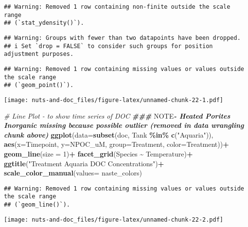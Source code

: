 \documentclass[
]{article}
\newenvironment{Shaded}{\begin{snugshade}}{\end{snugshade}}
\newcommand{\AlertTok}[1]{\textcolor[rgb]{0.94,0.16,0.16}{#1}}
\newcommand{\AttributeTok}[1]{\textcolor[rgb]{0.13,0.29,0.53}{#1}}
\newcommand{\CommentTok}[1]{\textcolor[rgb]{0.56,0.35,0.01}{\textit{#1}}}
\newcommand{\DecValTok}[1]{\textcolor[rgb]{0.00,0.00,0.81}{#1}}
\newcommand{\DocumentationTok}[1]{\textcolor[rgb]{0.56,0.35,0.01}{\textbf{\textit{#1}}}}
\newcommand{\FunctionTok}[1]{\textcolor[rgb]{0.13,0.29,0.53}{\textbf{#1}}}
\newcommand{\NormalTok}[1]{#1}
\newcommand{\SpecialCharTok}[1]{\textcolor[rgb]{0.81,0.36,0.00}{\textbf{#1}}}
\newcommand{\StringTok}[1]{\textcolor[rgb]{0.31,0.60,0.02}{#1}}
\begin{document}
\begin{verbatim}
## Warning: Removed 1 row containing non-finite outside the scale range
## (`stat_ydensity()`).
\end{verbatim}

\begin{verbatim}
## Warning: Groups with fewer than two datapoints have been dropped.
## i Set `drop = FALSE` to consider such groups for position adjustment purposes.
\end{verbatim}

\begin{verbatim}
## Warning: Removed 1 row containing missing values or values outside the scale range
## (`geom_point()`).
\end{verbatim}

\texttt{[image: nuts-and-doc\_files/figure-latex/unnamed-chunk-22-1.pdf]}

\begin{Shaded}
\begin{Highlighting}[]
\CommentTok{\# Line Plot {-} to show time series of DOC}
  \DocumentationTok{\#\#\# }\AlertTok{NOTE}\DocumentationTok{{-} Heated Porites Inorganic missing because possible outlier (removed in data wrangling chunk above)}
\FunctionTok{ggplot}\NormalTok{(}\AttributeTok{data=}\FunctionTok{subset}\NormalTok{(doc, Tank }\SpecialCharTok{\%in\%} \FunctionTok{c}\NormalTok{(}\StringTok{"Aquaria"}\NormalTok{)), }\FunctionTok{aes}\NormalTok{(}\AttributeTok{x=}\NormalTok{Timepoint, }\AttributeTok{y=}\NormalTok{NPOC\_uM, }\AttributeTok{group=}\NormalTok{Treatment, }\AttributeTok{color=}\NormalTok{Treatment))}\SpecialCharTok{+}
  \FunctionTok{geom\_line}\NormalTok{(}\AttributeTok{size =} \DecValTok{1}\NormalTok{)}\SpecialCharTok{+}
  \FunctionTok{facet\_grid}\NormalTok{(Species }\SpecialCharTok{\textasciitilde{}}\NormalTok{ Temperature)}\SpecialCharTok{+}
  \FunctionTok{ggtitle}\NormalTok{(}\StringTok{"Treatment Aquaria DOC Concentrations"}\NormalTok{)}\SpecialCharTok{+}
  \FunctionTok{scale\_color\_manual}\NormalTok{(}\AttributeTok{values=}\NormalTok{ naste\_colors)}
\end{Highlighting}
\end{Shaded}

\begin{verbatim}
## Warning: Removed 1 row containing missing values or values outside the scale range
## (`geom_line()`).
\end{verbatim}

\texttt{[image: nuts-and-doc\_files/figure-latex/unnamed-chunk-22-2.pdf]}
\end{document}
